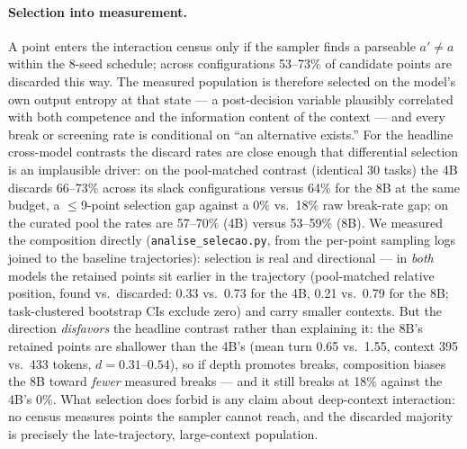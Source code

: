 \documentclass{article}
\theoremstyle{remark}
\begin{document}
\paragraph{Selection into measurement.} A point enters the interaction
census only if the sampler finds a parseable $a' \neq a$ within the 8-seed
schedule; across configurations 53--73\% of candidate points are discarded
this way. The measured population is therefore selected on the model's own
output entropy at that state --- a post-decision variable plausibly
correlated with both competence and the information content of the context
--- and every break or screening rate is conditional on ``an alternative
exists.'' For the headline cross-model contrasts the discard rates are close
enough that differential selection is an implausible driver: on the
pool-matched contrast (identical 30 tasks) the 4B discards 66--73\% across
its slack configurations versus 64\% for the 8B at the same budget, a
$\leq$9-point selection gap against a 0\% vs.\ 18\% raw break-rate gap; on
the curated pool the rates are 57--70\% (4B) versus 53--59\% (8B). We
measured the composition directly (\texttt{analise\_selecao.py}, from the
per-point sampling logs joined to the baseline trajectories): selection is
real and directional --- in \emph{both} models the retained points sit
earlier in the trajectory (pool-matched relative position, found vs.\
discarded: 0.33 vs.\ 0.73 for the 4B, 0.21 vs.\ 0.79 for the 8B;
task-clustered bootstrap CIs exclude zero) and carry smaller contexts. But
the direction \emph{disfavors} the headline contrast rather than explaining
it: the 8B's retained points are shallower than the 4B's (mean turn 0.65
vs.\ 1.55, context 395 vs.\ 433 tokens, $d = 0.31$--$0.54$), so if depth
promotes breaks, composition biases the 8B toward \emph{fewer} measured
breaks --- and it still breaks at 18\% against the 4B's 0\%. What selection
does forbid is any claim about deep-context interaction: no census measures
points the sampler cannot reach, and the discarded majority is precisely
the late-trajectory, large-context population.
\end{document}
